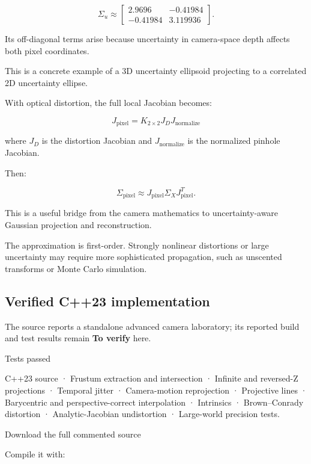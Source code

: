 \[
 \boxed{ \Sigma_u\approx \begin{bmatrix} 2.9696&-0.41984\\ -0.41984&3.119936 \end{bmatrix} }.
\]

Its off-diagonal terms arise because uncertainty in camera-space depth affects both pixel coordinates.

This is a concrete example of a 3D uncertainty ellipsoid projecting to a correlated 2D uncertainty ellipse.

With optical distortion, the full local Jacobian becomes:

\[
 \boxed{ J_{\mathrm{pixel}} = K_{2\times2}J_DJ_{\mathrm{normalize}} }
\]

where \(J_D\) is the distortion Jacobian and \(J_{\mathrm{normalize}}\) is the normalized pinhole Jacobian.

Then:

\[
 \boxed{ \Sigma_{\mathrm{pixel}} \approx J_{\mathrm{pixel}} \Sigma_X J_{\mathrm{pixel}}^T }.
\]

This is a useful bridge from the camera mathematics to uncertainty-aware Gaussian projection and reconstruction.

The approximation is first-order. Strongly nonlinear distortions or large uncertainty may require more sophisticated propagation, such as unscented transforms or Monte Carlo simulation.

\subsection{Verified C++23 implementation}\label{02-foundations-ii-ch037-verified-c23-implementation}

\hypertarget{02-foundations-ii-ch037-verified-c23-implementation}{}

The source reports a standalone advanced camera laboratory; its reported build and test results remain \textbf{To verify} here.

Tests passed

C++23 source · Frustum extraction and intersection · Infinite and reversed-Z projections · Temporal jitter · Camera-motion reprojection · Projective lines · Barycentric and perspective-correct interpolation · Intrinsics · Brown--Conrady distortion · Analytic-Jacobian undistortion · Large-world precision tests.

Download the full commented source

Compile it with:

